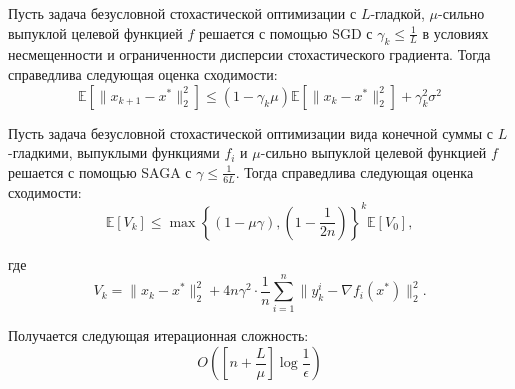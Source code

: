 \begin{theorem}
    Пусть задача безусловной стохастической оптимизации с $L$-гладкой,
    $\mu$-сильно выпуклой целевой функцией $f$ решается с помощью SGD с $\gamma_k \leq \frac{1}{L}$
    в условиях несмещенности и ограниченности дисперсии стохастического градиента.
    Тогда справедлива следующая оценка сходимости:
    $$\mathbb{E} \left[ \| x_{k+1} - x^* \|_2^2 \right] \leq (1 - \gamma_k \mu) \mathbb{E} \left[ \| x_k - x^* \|_2^2 \right] + \gamma_k^2 \sigma^2$$
\end{theorem}

\begin{theorem}
    Пусть задача безусловной стохастической оптимизации вида конечной суммы с $L$-гладкими, 
    выпуклыми функциями $f_i$ и $\mu$-сильно выпуклой целевой функцией $f$ решается 
    с помощью SAGA с $\gamma \leq \frac{1}{6L}$. 
    Тогда справедлива следующая оценка сходимости:
    $$\mathbb{E} [V_k] \leq \max \left\{ (1 - \mu \gamma), \left(1 - \frac{1}{2n}\right) \right\}^k \mathbb{E} [V_0],$$

    где
    $$V_k = \| x_k - x^* \|_2^2 + 4n \gamma^2 \cdot \frac{1}{n} \sum_{i=1}^n \| y_k^i - \nabla f_i(x^*) \|_2^2.$$

    Получается следующая итерационная сложность:
    $$O \left( \left[ n + \frac{L}{\mu} \right] \log \frac{1}{\epsilon} \right)$$
\end{theorem}
